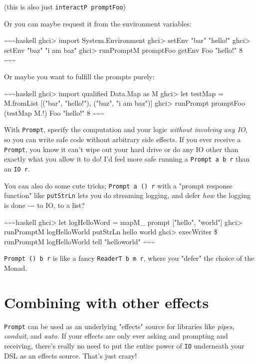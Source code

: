 \documentclass[]{article}
\begin{document}
(this is also just \texttt{interactP\ promptFoo})

Or you can maybe request it from the environment variables:

\textasciitilde{}\textasciitilde{}\textasciitilde{}haskell ghci\textgreater{}
import System.Environment ghci\textgreater{} setEnv "bar" "hello!"
ghci\textgreater{} setEnv "baz" "i am baz" ghci\textgreater{} runPromptM
promptFoo getEnv Foo "hello!" 8
\textasciitilde{}\textasciitilde{}\textasciitilde{}

Or maybe you want to fulfill the prompts purely:

\textasciitilde{}\textasciitilde{}\textasciitilde{}haskell ghci\textgreater{}
import qualified Data.Map as M ghci\textgreater{} let testMap = M.fromList
{[}("bar", "hello!"), ("baz", "i am baz"){]} ghci\textgreater{} runPrompt
promptFoo (testMap M.!) Foo "hello!" 8
\textasciitilde{}\textasciitilde{}\textasciitilde{}

With \texttt{Prompt}, specify the computation and your logic \emph{without
involving any IO}, so you can write safe code without arbitrary side effects. If
you ever receive a \texttt{Prompt}, you know it can't wipe out your hard drive
or do any IO other than exactly what you allow it to do! I'd feel more safe
running a \texttt{Prompt\ a\ b\ r} than an \texttt{IO\ r}.

You can also do some cute tricks; \texttt{Prompt\ a\ ()\ r} with a "prompt
response function" like \texttt{putStrLn} lets you do streaming logging, and
defer \emph{how} the logging is done -\/-\/- to IO, to a list?

\textasciitilde{}\textasciitilde{}\textasciitilde{}haskell ghci\textgreater{}
let logHelloWord = mapM\_ prompt {[}"hello", "world"{]} ghci\textgreater{}
runPromptM logHelloWorld putStrLn hello world ghci\textgreater{} execWriter \$
runPromptM logHelloWorld tell "helloworld"
\textasciitilde{}\textasciitilde{}\textasciitilde{}

\texttt{Prompt\ ()\ b\ r} is like a fancy \texttt{ReaderT\ b\ m\ r}, where you
"defer" the choice of the Monad.

\section{Combining with other effects}

\texttt{Prompt} can be used as an underlying "effects" source for libraries like
\emph{pipes}, \emph{conduit}, and \emph{auto}. If your effects are only ever
asking and prompting and receiving, there's really no need to put the entire
power of \texttt{IO} underneath your DSL as an effects source. That's just
crazy!
\end{document}
